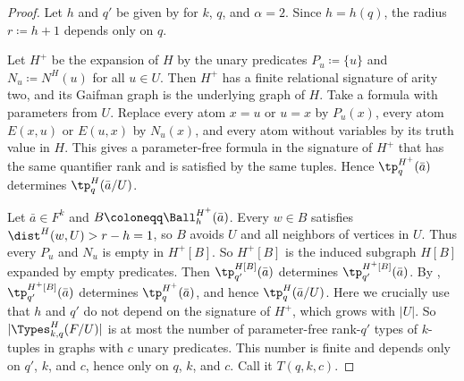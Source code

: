 \begin{proof}
  Let $h$ and $q'$ be given by  for $k$, $q$, and $\alpha=2$.
  Since $h=h(q)$, the radius $r\coloneqq h+1$ depends only on $q$.

  Let $H^+$ be the expansion of $H$ by the unary predicates $P_u\coloneqq\{u\}$ and $N_u\coloneqq N^H(u)$ for all $u\in U$.
  Then $H^+$ has a finite relational signature of arity two, and its Gaifman graph is the underlying graph of $H$.
  Take a formula with parameters from $U$.
  Replace every atom $x=u$ or $u=x$ by $P_u(x)$, every atom $E(x,u)$ or $E(u,x)$ by $N_u(x)$, and every atom without variables by its truth value in $H$.
  This gives a parameter-free formula in the signature of $H^+$ that has the same quantifier rank and is satisfied by the same tuples.
  Hence $\tp^{H^+}_q(\bar a)$ determines $\tp^H_q(\bar a/U)$.

  Let $\bar a\in F^k$ and $B\coloneqq \Ball^{H^+}_h(\bar a)$.
  Every $w\in B$ satisfies $\dist^H(w,U)>r-h=1$, so $B$ avoids $U$ and all neighbors of vertices in $U$.
  Thus every $P_u$ and $N_u$ is empty in $H^+[B]$.
  So $H^+[B]$ is the induced subgraph $H[B]$ expanded by empty predicates.
  Then $\tp^{H[B]}_{q'}(\bar a)$ determines $\tp^{H^+[B]}_{q'}(\bar a)$.
  By , $\tp^{H^+[B]}_{q'}(\bar a)$ determines $\tp^{H^+}_q(\bar a)$, and hence $\tp^H_q(\bar a/U)$.
  Here we crucially use that $h$ and $q'$ do not depend on the signature of $H^+$, which grows with $|U|$.
  So $|\Types^H_{k,q}(F/U)|$ is at most the number of parameter-free rank-$q'$ types of $k$-tuples in graphs with $c$ unary predicates.
  This number is finite and depends only on $q'$, $k$, and $c$, hence only on $q$, $k$, and $c$.
  Call it $T(q,k,c)$.
\end{proof}

